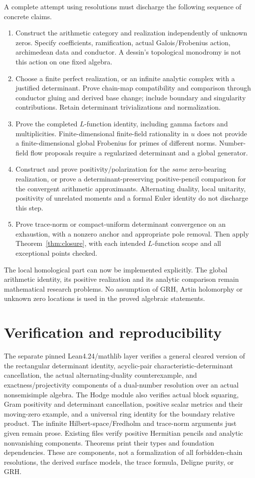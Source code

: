 A complete attempt using resolutions must discharge the following sequence of concrete claims.
\begin{enumerate}
\item Construct the arithmetic category and realization independently of unknown zeros. Specify coefficients, ramification, actual Galois/Frobenius action, archimedean data and conductor. A dessin's topological monodromy is not this action on one fixed algebra.
\item Choose a finite perfect realization, or an infinite analytic complex with a justified determinant. Prove chain-map compatibility and comparison through conductor gluing and derived base change; include boundary and singularity contributions. Retain determinant trivializations and normalization.
\item Prove the completed $L$-function identity, including gamma factors and multiplicities. Finite-dimensional finite-field rationality in $u$ does not provide a finite-dimensional global Frobenius for primes of different norms. Number-field flow proposals \cite{Deninger} require a regularized determinant and a global generator.
\item Construct and prove positivity/polarization for the \emph{same} zero-bearing realization, or prove a determinant-preserving positive-pencil comparison for the convergent arithmetic approximants. Alternating duality, local unitarity, positivity of unrelated moments and a formal Euler identity do not discharge this step.
\item Prove trace-norm or compact-uniform determinant convergence on an exhaustion, with a nonzero anchor and appropriate pole removal. Then apply Theorem~\ref{thm:closure}, with each intended $L$-function scope and all exceptional points checked.
\end{enumerate}
The local homological part can now be implemented explicitly. The global arithmetic identity, its positive realization and its analytic comparison remain mathematical research problems. No assumption of GRH, Artin holomorphy or unknown zero locations is used in the proved algebraic statements.

\section{Verification and reproducibility}
The separate pinned Lean4.24/mathlib layer verifies a general cleared version of the rectangular determinant identity, acyclic-pair characteristic-determinant cancellation, the actual alternating-duality counterexample, and exactness/projectivity components of a dual-number resolution over an actual nonsemisimple algebra. The Hodge module also verifies actual block squaring, Gram positivity and determinant cancellation, positive scalar metrics and their moving-zero example, and a universal ring identity for the boundary relative product. The infinite Hilbert-space/Fredholm and trace-norm arguments just given remain prose. Existing files verify positive Hermitian pencils and analytic nonvanishing components. Theorems print their types and foundation dependencies. These are components, not a formalization of all forbidden-chain resolutions, the derived surface models, the trace formula, Deligne purity, or GRH.

